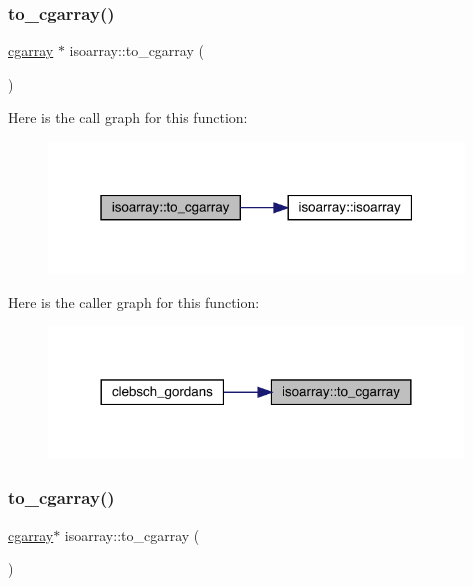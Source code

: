 \subsubsection{\texorpdfstring{to\_cgarray()}{to\_cgarray()}\hspace{0.1cm}{\footnotesize\ttfamily [1/3]}}
{\footnotesize\ttfamily \mbox{\hyperlink{classcgarray}{cgarray}} $\ast$ isoarray\+::to\+\_\+cgarray (\begin{DoxyParamCaption}{ }\end{DoxyParamCaption})}

Here is the call graph for this function\+:
\nopagebreak
\begin{figure}[H]
\begin{center}
\leavevmode
\includegraphics[width=313pt]{d5/dd9/classisoarray_a6af30a576928cf3005c5c6464e64b70e_cgraph}
\end{center}
\end{figure}
Here is the caller graph for this function\+:
\nopagebreak
\begin{figure}[H]
\begin{center}
\leavevmode
\includegraphics[width=312pt]{d5/dd9/classisoarray_a6af30a576928cf3005c5c6464e64b70e_icgraph}
\end{center}
\end{figure}
\mbox{\label{classisoarray_a66ca849c4b34cafeee945037d814a8dc}} 
\subsubsection{\texorpdfstring{to\_cgarray()}{to\_cgarray()}\hspace{0.1cm}{\footnotesize\ttfamily [2/3]}}
{\footnotesize\ttfamily \mbox{\hyperlink{classcgarray}{cgarray}}$\ast$ isoarray\+::to\+\_\+cgarray (\begin{DoxyParamCaption}{ }\end{DoxyParamCaption})}

